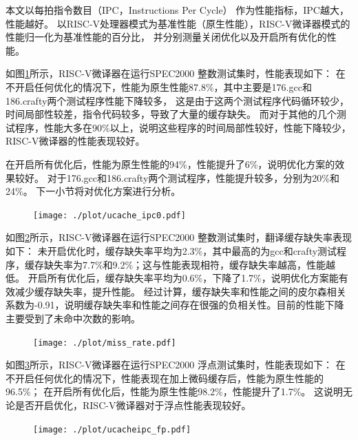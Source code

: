 本文以每拍指令数目（IPC，Instructions Per Cycle）
作为性能指标，IPC越大，性能越好。
以RISC-V处理器模式为基准性能（原生性能），RISC-V微译器模式的性能归一化为基准性能的百分比，
并分别测量关闭优化以及开启所有优化的性能。

如图\ref{img:ipc}所示，RISC-V微译器在运行SPEC2000 整数测试集时，性能表现如下：
在不开启任何优化的情况下，性能为原生性能87.8\%，其中主要是176.gcc和186.crafty两个测试程序性能下降较多，
这是由于这两个测试程序代码循环较少，时间局部性较差，指令代码较多，导致了大量的缓存缺失。
而对于其他的几个测试程序，性能大多在90\%以上，说明这些程序的时间局部性较好，性能下降较少，RISC-V微译器的性能表现较好。

在开启所有优化后，性能为原生性能的94\%，性能提升了6\%，说明优化方案的效果较好。
对于176.gcc和186.crafty两个测试程序，性能提升较多，分别为20\%和24\%。
下一小节将对优化方案进行分析。


\begin{figure}[!htbp]
  \centering
  \texttt{[image: ./plot/ucache\_ipc0.pdf]}
  \label{img:ipc}
\end{figure}

如图\ref{img:miss_rate}所示，RISC-V微译器在运行SPEC2000 整数测试集时，翻译缓存缺失率表现如下：
未开启优化时，缓存缺失率平均为2.3\%，其中最高的为gcc和crafty测试程序，缓存缺失率为7.7\%和9.2\%；这与性能表现相符，缓存缺失率越高，性能越低。
开启所有优化后，缓存缺失率平均为0.6\%，下降了1.7\%，说明优化方案能有效减少缓存缺失率，提升性能。
经过计算，缓存缺失率和性能之间的皮尔森相关系数为-0.91，说明缓存缺失率和性能之间存在很强的负相关性。目前的性能下降主要受到了未命中次数的影响。

\begin{figure}[!htbp]
  \centering
  \texttt{[image: ./plot/miss\_rate.pdf]}
  \label{img:miss_rate}
\end{figure}

如图\ref{img:ipc_fp}所示，RISC-V微译器在运行SPEC2000 浮点测试集时，性能表现如下：
在不开启任何优化的情况下，性能表现在加上微码缓存后，性能为原生性能的96.5\%；
在开启所有优化后，性能为原生性能98.2\%，性能提升了1.7\%。
这说明无论是否开启优化，RISC-V微译器对于浮点性能表现较好。


\begin{figure}[!htbp]
  \centering
  \texttt{[image: ./plot/ucacheipc\_fp.pdf]}
  \label{img:ipc_fp}
\end{figure}


